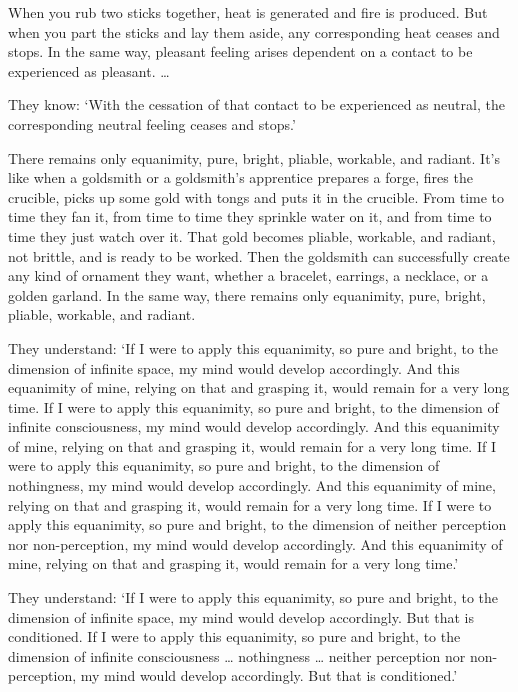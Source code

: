 \documentclass[12pt,openany]{book}%
\begin{document}
When you rub two sticks together, heat is generated and fire is produced. But when you part the sticks and lay them aside, any corresponding heat ceases and stops. In the same way, pleasant feeling arises dependent on a contact to be experienced as pleasant. … 

They know: ‘With the cessation of that contact to be experienced as neutral, the corresponding neutral feeling ceases and stops.’ 

There remains only equanimity, pure, bright, pliable, workable, and radiant. It’s like when a goldsmith or a goldsmith’s apprentice prepares a forge, fires the crucible, picks up some gold with tongs and puts it in the crucible. From time to time they fan it, from time to time they sprinkle water on it, and from time to time they just watch over it. That gold becomes pliable, workable, and radiant, not brittle, and is ready to be worked. Then the goldsmith can successfully create any kind of ornament they want, whether a bracelet, earrings, a necklace, or a golden garland. In the same way, there remains only equanimity, pure, bright, pliable, workable, and radiant. 

They understand: ‘If I were to apply this equanimity, so pure and bright, to the dimension of infinite space, my mind would develop accordingly. And this equanimity of mine, relying on that and grasping it, would remain for a very long time. If I were to apply this equanimity, so pure and bright, to the dimension of infinite consciousness, my mind would develop accordingly. And this equanimity of mine, relying on that and grasping it, would remain for a very long time. If I were to apply this equanimity, so pure and bright, to the dimension of nothingness, my mind would develop accordingly. And this equanimity of mine, relying on that and grasping it, would remain for a very long time. If I were to apply this equanimity, so pure and bright, to the dimension of neither perception nor non-perception, my mind would develop accordingly. And this equanimity of mine, relying on that and grasping it, would remain for a very long time.’ 

They understand: ‘If I were to apply this equanimity, so pure and bright, to the dimension of infinite space, my mind would develop accordingly. But that is conditioned. If I were to apply this equanimity, so pure and bright, to the dimension of infinite consciousness … nothingness … neither perception nor non-perception, my mind would develop accordingly. But that is conditioned.’ 
\end{document}
